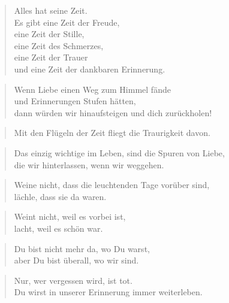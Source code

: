 \documentclass[ngerman,a4paper,11pt]{scrreprt}
\begin{document}
\begin{verse}
Alles hat seine Zeit. \\
Es gibt eine Zeit der Freude, \\
eine Zeit der Stille, \\
eine Zeit des Schmerzes, \\
eine Zeit der Trauer \\
und eine Zeit der dankbaren Erinnerung. \\
\end{verse}

\begin{verse}
Wenn Liebe einen Weg zum Himmel fände \\
und Erinnerungen Stufen hätten, \\
dann würden wir hinaufsteigen und dich zurückholen! \\
\end{verse}

\begin{verse}
Mit den Flügeln der Zeit fliegt die Traurigkeit davon. \\
\end{verse}

\begin{verse}
Das einzig wichtige im Leben, sind die Spuren von Liebe, \\
die wir hinterlassen, wenn wir weggehen. \\
\end{verse}

\begin{verse}
Weine nicht, dass die leuchtenden Tage vorüber sind, \\
lächle, dass sie da waren. \\
\end{verse}

\begin{verse}
Weint nicht, weil es vorbei ist, \\
lacht, weil es schön war. \\
\end{verse}

\begin{verse}
Du bist nicht mehr da, wo Du warst, \\
aber Du bist überall, wo wir sind. \\
\end{verse}

\begin{verse}
Nur, wer vergessen wird, ist tot. \\
Du wirst in unserer Erinnerung immer weiterleben. \\
\end{verse}
\end{document}
